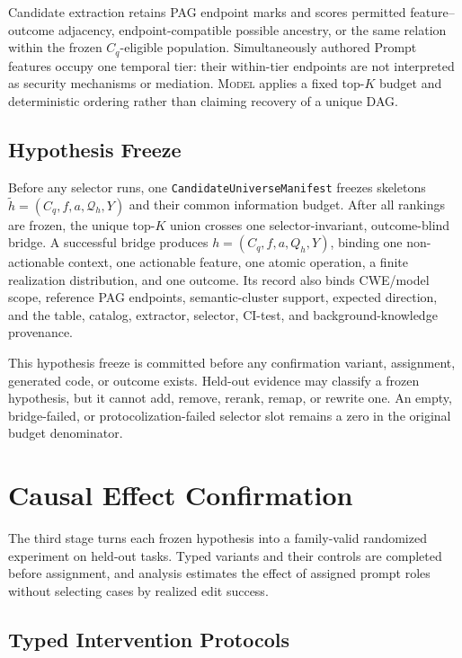 \documentclass[acmsmall,screen,review,anonymous]{acmart}
\newcommand{\model}{\textsc{Model}\xspace}
\begin{document}
Candidate extraction retains PAG endpoint marks and scores permitted
feature--outcome adjacency, endpoint-compatible possible ancestry, or the same
relation within the frozen $C_q$-eligible population. Simultaneously authored
Prompt features occupy one temporal tier: their within-tier endpoints are not
interpreted as security mechanisms or mediation. \model applies a fixed
top-$K$ budget and deterministic ordering rather than claiming recovery of a
unique DAG.

\subsection{Hypothesis Freeze}

Before any selector runs, one \texttt{CandidateUniverseManifest} freezes
skeletons $\widetilde h=(C_q,f,a,\mathcal Q_h,Y)$ and their common information
budget. After all rankings are frozen, the unique top-$K$ union crosses one
selector-invariant, outcome-blind bridge. A successful bridge produces
$h=(C_q,f,a,Q_h,Y)$, binding one non-actionable context, one actionable
feature, one atomic operation, a finite realization distribution, and one
outcome. Its record also binds CWE/model scope, reference PAG endpoints,
semantic-cluster support, expected direction, and the table, catalog,
extractor, selector, CI-test, and background-knowledge provenance.

This hypothesis freeze is committed before any confirmation variant,
assignment, generated code, or outcome exists. Held-out evidence may classify
a frozen hypothesis, but it cannot add, remove, rerank, remap, or rewrite one.
An empty, bridge-failed, or protocolization-failed selector slot remains a zero
in the original budget denominator.

\section{Causal Effect Confirmation}

The third stage turns each frozen hypothesis into a family-valid randomized
experiment on held-out tasks. Typed variants and their controls are completed
before assignment, and analysis estimates the effect of assigned prompt roles
without selecting cases by realized edit success.

\subsection{Typed Intervention Protocols}
\end{document}
